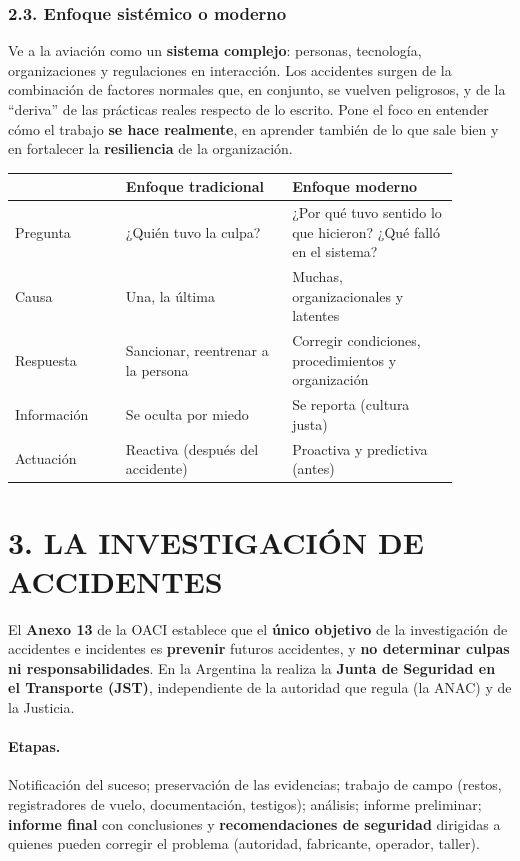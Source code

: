 \subsubsection*{2.3. Enfoque sistémico o moderno}
Ve a la aviación como un \textbf{sistema complejo}: personas, tecnología, organizaciones y
regulaciones en interacción. Los accidentes surgen de la combinación de factores normales que, en
conjunto, se vuelven peligrosos, y de la ``deriva'' de las prácticas reales respecto de lo
escrito. Pone el foco en entender cómo el trabajo \textbf{se hace realmente}, en aprender también
de lo que sale bien y en fortalecer la \textbf{resiliencia} de la organización.

\begin{center}
\small
\begin{tabular}{|p{0.22\linewidth}|p{0.33\linewidth}|p{0.33\linewidth}|}
\hline
 & \textbf{Enfoque tradicional} & \textbf{Enfoque moderno} \\ \hline
Pregunta & ¿Quién tuvo la culpa? & ¿Por qué tuvo sentido lo que hicieron? ¿Qué falló en el
sistema? \\ \hline
Causa & Una, la última & Muchas, organizacionales y latentes \\ \hline
Respuesta & Sancionar, reentrenar a la persona & Corregir condiciones, procedimientos y
organización \\ \hline
Información & Se oculta por miedo & Se reporta (cultura justa) \\ \hline
Actuación & Reactiva (después del accidente) & Proactiva y predictiva (antes) \\ \hline
\end{tabular}
\end{center}

\section*{3. LA INVESTIGACIÓN DE ACCIDENTES}

El \textbf{Anexo 13} de la OACI establece que el \textbf{único objetivo} de la investigación de
accidentes e incidentes es \textbf{prevenir} futuros accidentes, y \textbf{no determinar culpas ni
responsabilidades}. En la Argentina la realiza la \textbf{Junta de Seguridad en el Transporte
(JST)}, independiente de la autoridad que regula (la ANAC) y de la Justicia.

\paragraph*{Etapas.} Notificación del suceso; preservación de las evidencias; trabajo de campo
(restos, registradores de vuelo, documentación, testigos); análisis; informe preliminar;
\textbf{informe final} con conclusiones y \textbf{recomendaciones de seguridad} dirigidas a
quienes pueden corregir el problema (autoridad, fabricante, operador, taller).

